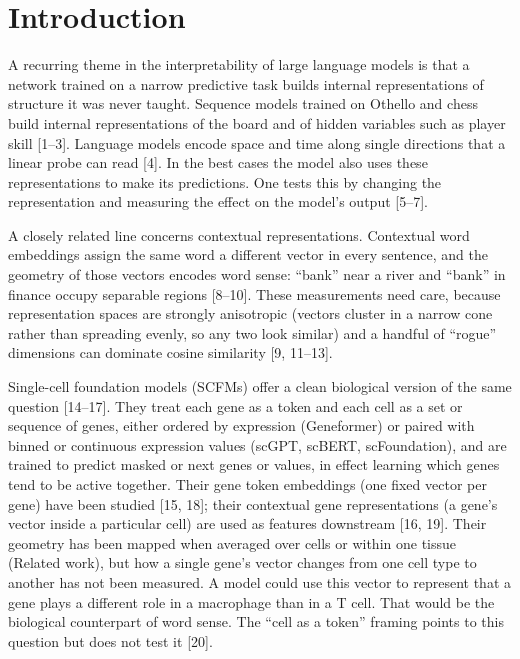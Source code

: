 \documentclass[
  11pt,
]{article}
\begin{document}
\section{Introduction}\label{introduction}

A recurring theme in the interpretability of large language models is
that a network trained on a narrow predictive task builds internal
representations of structure it was never taught. Sequence models
trained on Othello and chess build internal representations of the board
and of hidden variables such as player skill {[}1--3{]}. Language models
encode space and time along single directions that a linear probe can
read {[}4{]}. In the best cases the model also uses these
representations to make its predictions. One tests this by changing the
representation and measuring the effect on the model's output
{[}5--7{]}.

A closely related line concerns contextual representations. Contextual
word embeddings assign the same word a different vector in every
sentence, and the geometry of those vectors encodes word sense: ``bank''
near a river and ``bank'' in finance occupy separable regions
{[}8--10{]}. These measurements need care, because representation spaces
are strongly anisotropic (vectors cluster in a narrow cone rather than
spreading evenly, so any two look similar) and a handful of ``rogue''
dimensions can dominate cosine similarity {[}9, 11--13{]}.

Single-cell foundation models (SCFMs) offer a clean biological version
of the same question {[}14--17{]}. They treat each gene as a token and
each cell as a set or sequence of genes, either ordered by expression
(Geneformer) or paired with binned or continuous expression values
(scGPT, scBERT, scFoundation), and are trained to predict masked or next
genes or values, in effect learning which genes tend to be active
together. Their gene token embeddings (one fixed vector per gene) have
been studied {[}15, 18{]}; their contextual gene representations (a
gene's vector inside a particular cell) are used as features downstream
{[}16, 19{]}. Their geometry has been mapped when averaged over cells or
within one tissue (Related work), but how a single gene's vector changes
from one cell type to another has not been measured. A model could use
this vector to represent that a gene plays a different role in a
macrophage than in a T cell. That would be the biological counterpart of
word sense. The ``cell as a token'' framing points to this question but
does not test it {[}20{]}.
\end{document}

